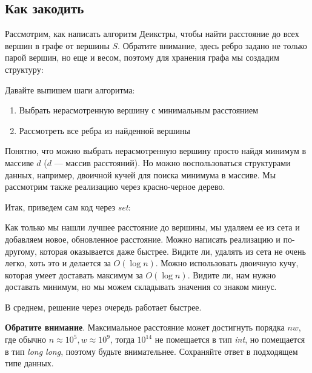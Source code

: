 \documentclass[../../main.tex]{subfiles}
\begin{document}
\subsection{Как закодить}

Рассмотрим, как написать алгоритм Деикстры, чтобы найти расстояние до всех вершин в графе от вершины $S$. 
Обратите внимание, здесь ребро задано не только парой вершин, но еще и весом, поэтому для хранения графа мы создадим структуру:




Давайте выпишем шаги алгоритма:
\begin{enumerate}[label=\Roman*]
    \item Выбрать нерасмотренную вершину с минимальным расстоянием
    \item Рассмотреть все ребра из найденной вершины 
\end{enumerate}
Понятно, что можно выбрать нерасмотренную вершину просто найдя минимум в массиве $d$ ($d$ --- массив расстояний). 
Но можно воспользоваться структурами данных, например, двоичной кучей для поиска минимума в массиве. Мы рассмотрим также реализацию через красно-черное дерево. 

Итак, приведем сам код через \textit{set}:




Как только мы нашли лучшее расстояние до вершины, мы удаляем ее из сета и добавляем новое, обновленное расстояние. Можно написать реализацию и по-другому, 
которая оказывается даже быстрее. Видите ли, удалять из сета не очень легко, хоть это и делается за $O( \log{n} )$. Можно использовать двоичную кучу, 
которая умеет доставать максимум за $O( \log{n} )$. Видите ли, нам нужно доставать минимум, но мы можем складывать значения со знаком минус. 




В среднем, решение через очередь работает быстрее.

\textbf{Обратите внимание}. Максимальное расстояние может достигнуть порядка $nw$, где обычно $n \approx 10^5, w \approx 10^{9}$, тогда $10^{14}$ не помещается в тип
\textit{int}, но помещается в тип \textit{long long}, поэтому будьте внимательнее. Сохраняйте ответ в подходящем типе данных.  
\end{document}
